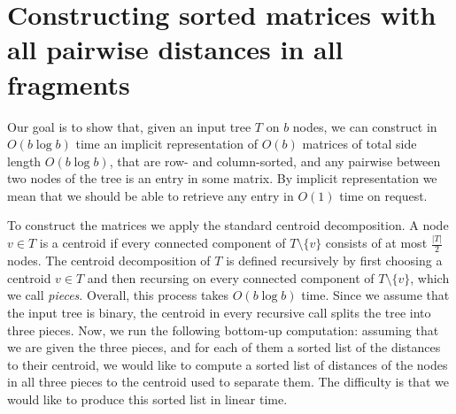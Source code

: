 \documentclass[a4paper,UKenglish]{lipics-v2016}
\theoremstyle{plain}
\begin{document}
\section{Constructing sorted matrices with all pairwise distances in all fragments}\label{appendix constructing sorted matrices using centroid decomp.}

Our goal is to show that, given an input tree $T$ on $b$ nodes, we can construct in $O(b\log b)$ time an implicit representation of $O(b)$
matrices of total side length $O(b\log b)$, that are row- and column-sorted, and any pairwise between two nodes of the tree is an entry in
some matrix. By implicit representation we mean that we should be able to retrieve any entry in $O(1)$ time on request.


To construct the matrices we apply the standard centroid decomposition. A node $v\in T$ is a centroid if every connected component of
$T\setminus\{v\}$ consists of at most $\frac{|T|}{2}$ nodes. The centroid decomposition of $T$ is defined recursively by first choosing a centroid
$v\in T$ and then recursing on every connected component of $T\setminus\{v\}$, which we call \emph{pieces}.
Overall, this process takes $O(b\log b)$ time. Since we assume that the input tree is binary, the centroid in every recursive call splits the tree
into three pieces. Now, we run the following bottom-up computation: assuming that we are given the three pieces, and for each of
them a sorted list of the distances to their centroid, we would like to compute a sorted list of distances of the nodes in all three pieces
to the centroid used to separate them. The difficulty is that we would like to produce this sorted list in linear time.
\end{document}
